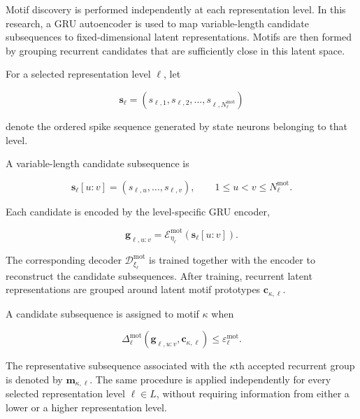 \documentclass[a4paper]{article}
\begin{document}
         Motif discovery is performed independently at each representation level. In this research, a GRU autoencoder is used to map variable-length candidate subsequences to fixed-dimensional latent representations. Motifs are then formed by grouping recurrent candidates that are sufficiently close in this latent space.

         For a selected representation level $\ell$, let

         \[
         \mathbf{s}_{\ell}
         =
         \left(
         s_{\ell,1},
         s_{\ell,2},
         \ldots,
         s_{\ell,N_{\ell}^{\mathrm{mot}}}
         \right)
         \]

         denote the ordered spike sequence generated by state neurons belonging to that level.

         A variable-length candidate subsequence is

         \[
         \mathbf{s}_{\ell}[u:v]
         =
         \left(
         s_{\ell,u},
         \ldots,
         s_{\ell,v}
         \right),
         \qquad
         1 \leq u < v \leq N_{\ell}^{\mathrm{mot}}.
         \]

         Each candidate is encoded by the level-specific GRU encoder,

         \[
         \mathbf{g}_{\ell,u:v}
         =
         \mathcal{E}^{\mathrm{mot}}_{\eta_{\ell}}
         \left(
         \mathbf{s}_{\ell}[u:v]
         \right).
         \]

         The corresponding decoder $\mathcal{D}^{\mathrm{mot}}_{\xi_{\ell}}$ is trained together with the encoder to reconstruct the candidate subsequences. After training, recurrent latent representations are grouped around latent motif prototypes $\mathbf{c}_{\kappa,\ell}$.

         A candidate subsequence is assigned to motif $\kappa$ when

         \[
         \Delta^{\mathrm{mot}}_{\ell}
         \left(
         \mathbf{g}_{\ell,u:v},
         \mathbf{c}_{\kappa,\ell}
         \right)
         \leq
         \varepsilon^{\mathrm{mot}}_{\ell}.
         \]

         The representative subsequence associated with the $\kappa$th accepted recurrent group is denoted by $\mathbf{m}_{\kappa,\ell}$. The same procedure is applied independently for every selected representation level $\ell \in L$, without requiring information from either a lower or a higher representation level.
\end{document}
